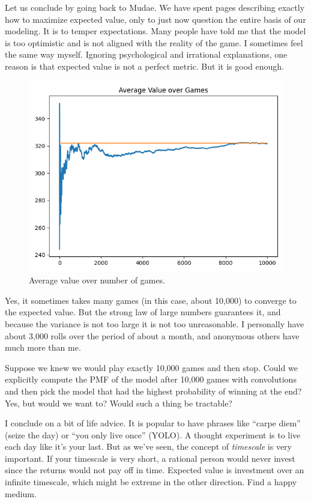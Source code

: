 \documentclass[11pt, oneside]{article}
\theoremstyle{plain}
\theoremstyle{definition}
\begin{document}
\label{here}
Let us conclude by going back to Mudae. We have spent \pageref{here}
pages describing exactly how to maximize expected value, only to just now
question the entire basis of our modeling. It is to temper expectations.
Many people have told me that the model is too optimistic and is not
aligned with the reality of the game. I sometimes feel the same way
myself. Ignoring psychological and irrational explanations, one reason is
that expected value is not a perfect metric. But it is good enough.
\begin{figure}[h!]
  \centering
  \includegraphics[scale=0.6]{graphs/game_value.png}
  \caption{Average value over number of games.}
\end{figure}

Yes, it sometimes takes many games (in this case, about 10,000) to converge
to the expected value. But the strong law of large numbers guarantees it, and
because the variance is not too large it is not too unreasonable. I personally
have about 3,000 rolls over the period of about a month, and anonymous others
have much more than me.

Suppose we knew we would play exactly 10,000 games and then stop. Could we
explicitly compute the PMF of the model after 10,000 games with convolutions
and then pick the model that had the highest probability of winning at the
end? Yes, but would we want to? Would such a thing be tractable?

I conclude on a bit of life advice. It is popular to have phrases like
\enquote{carpe diem} (seize the day) or \enquote{you only live once} (YOLO).
A thought experiment is to live each day like it's your last. But as we've
seen, the concept of \textit{timescale} is very important. If your timescale
is very short, a rational person would never invest since the returns would
not pay off in time. Expected value is investment over an infinite timescale,
which might be extreme in the other direction. Find a happy medium.
\end{document}
